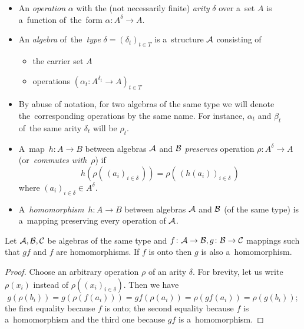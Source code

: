 \begin{itemize}
\item An \emph{operation\/} $\alpha$ with the (not necessarily finite)
  \emph{arity\/} $\delta$ over a~set $A$ is a~function of~the~form
  $\alpha\colon A^{\delta} \to A$.

\item An \emph{algebra\/} of~the~\emph{type\/} $\delta = (\delta_t)_{t\in T}$
is a~structure $\mathcal{A}$ consisting of
  \begin{itemize}
  \item the carrier set $A$
  \item operations $(\alpha_t\colon A^{\delta_t} \to A)_{t\in T}$
  \end{itemize}

\item By abuse of notation, for two algebras of the same type we will denote
the~corresponding operations by the same name.
For instance, $\alpha_t$ and $\beta_t$ of~the same arity $\delta_t$ will be
$\rho_t$.

\item A~map~$h\colon A \to B$ between algebras $\mathcal{A}$ and $\mathcal{B}$
\emph{preserves\/} operation $\rho\colon A^\delta \to A$ (or~\emph{commutes
with\/}~$\rho$) if
\[
  h( \rho(\, (a_i)_{i\in \delta}\,)) = \rho(\, (h(a_i))_{i\in \delta}\, )
\]
where $(a_i)_{i\in \delta} \in A^\delta$.

\item A~\emph{homomorphism\/}~$h\colon A \to B$ between algebras $\mathcal{A}$ and
$\mathcal{B}$ (of the same type) is a~mapping preserving every operation of $\mathcal{A}$.
\end{itemize}

\begin{lem} \label{lem:onto->homo}
  Let $\mathcal{A}, \mathcal{B}, \mathcal{C}$ be algebras of the same type and $f\colon \mathcal{A} \to
  \mathcal{B}, g\colon \mathcal{B} \to \mathcal{C}$ mappings such that $gf$ and $f$ are
  homomorphisms.
  If $f$ is onto then $g$ is also a~homomorphism.
\end{lem}
\begin{proof}
  Choose an arbitrary operation $\rho$ of an arity $\delta$.
  For brevity, let us write $\rho(x_i)$ instead of $\rho((x_i)_{i\in \delta})$.
  Then we have
  \[
    g( \rho(b_i) )
    = g( \rho(f(a_i)) )
    = gf( \rho(a_i) )
    = \rho( gf(a_i) )
    = \rho( g(b_i) );
  \]
  the first equality because $f$ is onto;
  the second equality because $f$ is a~homomorphism and the third one because
  $gf$ is a~homomorphism.
\end{proof}

